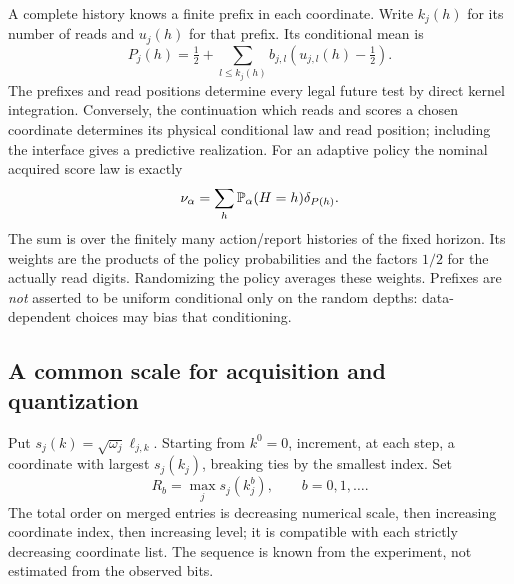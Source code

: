 A complete history knows a finite prefix in each coordinate. Write $k_j(h)$ for its number of reads and $u_j(h)$ for that prefix. Its conditional mean is
\begin{equation}\label{eq:actualcenter}
 P_j(h)=\tfrac12+\sum_{l\le k_j(h)}b_{j,l}(u_{j,l}(h)-\tfrac12).
\end{equation}
The prefixes and read positions determine every legal future test by direct kernel integration. Conversely, the continuation which reads and scores a chosen coordinate determines its physical conditional law and read position; including the interface gives a predictive realization. For an adaptive policy the nominal acquired score law is exactly
\begin{equation}\label{eq:adaptiveactual}
 \nu_\alpha=\sum_{h}\mathbb P_\alpha(H=h)\delta_{P(h)}.
\end{equation}
The sum is over the finitely many action/report histories of the fixed horizon. Its weights are the products of the policy probabilities and the factors $1/2$ for the actually read digits. Randomizing the policy averages these weights. Prefixes are \emph{not} asserted to be uniform conditional only on the random depths: data-dependent choices may bias that conditioning.

\subsection{A common scale for acquisition and quantization}
Put $s_j(k)=\sqrt{\omega_j}\ell_{j,k}$. Starting from $k^0=0$, increment, at each step, a coordinate with largest $s_j(k_j)$, breaking ties by the smallest index. Set
\begin{equation}\label{eq:greedy}
 R_b=\max_j s_j(k_j^b),\qquad b=0,1,\ldots.
\end{equation}
The total order on merged entries is decreasing numerical scale, then increasing coordinate index, then increasing level; it is compatible with each strictly decreasing coordinate list. The sequence is known from the experiment, not estimated from the observed bits.

